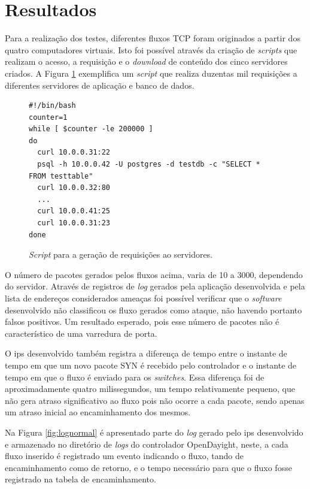 \section{Resultados}

Para a realização dos testes, diferentes fluxos TCP foram originados a partir dos quatro computadores virtuais. Isto foi possível através da criação de \textit{scripts} que realizam o acesso, a requisição e o \textit{download} de conteúdo dos cinco servidores criados. A Figura \ref{cod:scriptsgera} exemplifica um \textit{script} que realiza duzentas mil requisições a diferentes servidores de aplicação e banco de dados.

\FloatBarrier
\begin{figure}[H]
\centering
\caption{\textit{Script} para a geração de requisições ao servidores.}
\begin{lstlisting}[belowskip=-0.05 \baselineskip]
#!/bin/bash
counter=1
while [ $counter -le 200000 ]
do
  curl 10.0.0.31:22
  psql -h 10.0.0.42 -U postgres -d testdb -c "SELECT *  FROM testtable"
  curl 10.0.0.32:80
  ...
  curl 10.0.0.41:25
  curl 10.0.0.31:23
done
\end{lstlisting}
\label{cod:scriptsgera}
\end{figure}

O número de pacotes gerados pelos fluxos acima, varia de 10 a 3000, dependendo do servidor. Através de registros de \textit{log} gerados pela aplicação desenvolvida e pela lista de endereços considerados ameaças foi possível verificar que o \textit{software} desenvolvido não classificou os fluxo gerados como ataque, não havendo portanto falsos positivos. Um resultado esperado, pois esse número de pacotes não é característico de uma varredura de porta.

O \gls{ips} desenvolvido também registra a diferença de tempo entre o instante de tempo em que um novo pacote SYN é recebido pelo controlador e o instante de tempo em que o fluxo é enviado para os \textit{switches}. Essa diferença foi de aproximadamente quatro milissegundos, um tempo relativamente pequeno, que não gera atraso significativo ao fluxo pois não ocorre a cada pacote, sendo apenas um atraso inicial ao encaminhamento dos mesmos.

Na Figura \ref{fig:lognormal} é apresentado parte do \textit{log} gerado pelo \gls{ips} desenvolvido e armazenado no diretório de \textit{logs} do controlador OpenDayight, neste, a cada fluxo inserido é registrado um evento indicando o fluxo, tando de encaminhamento como de retorno, e o tempo necessário para que o fluxo fosse registrado na tabela de encaminhamento.

